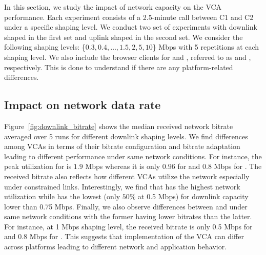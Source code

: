 In this section, we study the impact of network capacity on the VCA performance. Each experiment consists of a 2.5-minute call between C1 and C2 under a specific shaping level. We conduct two set of experiments with downlink shaped in the first set and uplink shaped in the second set. We consider the following shaping levels: \{$0.3, 0.4, \dots, 1.5, 2, 5, 10$\} Mbps with 5 repetitions at each shaping level.  We also include the browser clients for \zoom and \teams, referred to as \zoombrowser and \teamsbrowser, respectively. This is done to understand if there are any platform-related differences. 




\subsection{Impact on network data rate} Figure~\ref{fig:downlink_bitrate} shows the median received network bitrate averaged over 5 runs for different downlink shaping levels. We find differences among VCAs in terms of their bitrate configuration and bitrate adaptation leading to different performance under same network conditions. For instance, the peak utilization for \teamsnative is $1.9$ Mbps whereas it is only $0.96$ for \zoomnative and $0.8$ Mbps for \meet. The received bitrate also reflects how different VCAs utilize the network especially under constrained links. Interestingly, we find that \zoomnative has the highest network utilization while \meet has the lowest (only $50\%$ at 0.5 Mbps) for downlink capacity lower than 0.75 Mbps. Finally, we also observe differences between \teamsbrowser and \teamsnative under same network conditions with the former having lower bitrates than the latter. For instance, at 1 Mbps shaping level, the received bitrate is only 0.5 Mbps for \teamsbrowser and 0.8 Mbps for \teamsnative. This suggests that implementation of the VCA can differ across platforms leading to different network and application behavior. 

